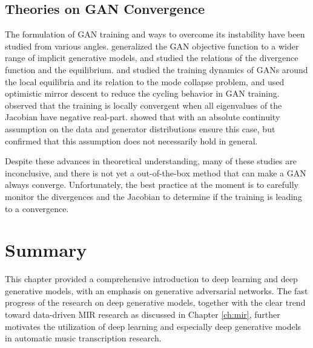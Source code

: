 \subsection{Theories on GAN Convergence}

The formulation of GAN training and ways to overcome its instability have been studied from various angles.
 generalized the GAN objective function to a wider range of implicit generative models, and  studied the relations of the divergence function and the equilibrium.
 and  studied the training dynamics of GANs around the local equilibria and its relation to the mode collapse problem, and  used optimistic mirror descent to reduce the cycling behavior in GAN training.
 observed that the training is locally convergent when all eigenvalues of the Jacobian have negative real-part.
 showed that with an absolute continuity assumption on the data and generator distributions ensure this case, but  confirmed that this assumption does not necessarily hold in general.

Despite these advances in theoretical understanding, many of these studies are inconclusive, and there is not yet a out-of-the-box method that can make a GAN always converge.
Unfortunately, the best practice at the moment is to carefully monitor the divergences and the Jacobian to determine if the training is leading to a convergence.


\section{Summary}
This chapter provided a comprehensive introduction to deep learning and deep generative models, with an emphasis on generative adversarial networks.
The fast progress of the research on deep generative models, together with the clear trend toward data-driven MIR research as discussed in Chapter \ref{ch:mir}, further motivates the utilization of deep learning and especially deep generative models in automatic music transcription research.
